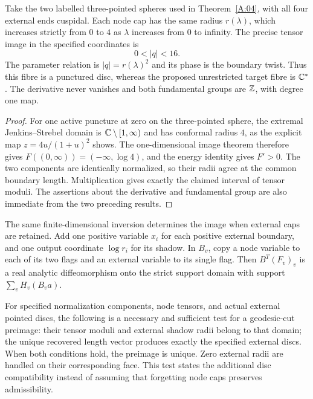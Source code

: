 \begin{example}
\label{A:04-exact-image}
Take the two labelled three-pointed spheres used in
Theorem~\ref{A:04}, with all four external ends cuspidal. Each node
cap has the same radius $r(\lambda)$, which increases strictly from
$0$ to $4$ as $\lambda$ increases from $0$ to infinity. The precise
tensor image in the specified coordinates is
\[
                    0<|q|<16.
\]
The parameter relation is $|q|=r(\lambda)^2$ and its phase is the
boundary twist. Thus this fibre is a punctured disc, whereas the
proposed unrestricted target fibre is ${\mathbb{C}}^*$. The derivative never
vanishes and both fundamental groups are ${\mathbb{Z}}$, with degree one map.
\end{example}

\begin{proof}
For one active puncture at zero on the three-pointed sphere,
the extremal Jenkins--Strebel domain is
${\mathbb{C}}\setminus[1,\infty)$ and has conformal radius $4$, as the explicit
map $z=4u/(1+u)^2$ shows. The one-dimensional image theorem therefore
gives $F((0,\infty))=(-\infty,\log4)$, and the energy identity gives
$F'>0$. The two components are identically normalized, so their
radii agree at the common boundary length. Multiplication gives
exactly the claimed interval of tensor moduli. The assertions about
the derivative and fundamental group are also immediate from the
two preceding results.
\end{proof}

\begin{proposition}
\label{A:bordered-radius-algorithm}
The same finite-dimensional inversion determines the image when
external caps are retained. Add one positive variable $x_i$ for each
positive external boundary, and one output coordinate $\log r_i$
for its shadow. In $B_v$, copy a node variable to each of its two
flags and an external variable to its single flag. Then
$B^T(F_v)_v$ is a real analytic diffeomorphism onto the strict
support domain with support $\sum_vH_v(B_va)$.

For specified normalization components, node tensors, and actual
external pointed discs, the following is a necessary and sufficient
test for a geodesic-cut preimage: their tensor moduli and external
shadow radii belong to that domain; the unique recovered length
vector produces exactly the specified external discs. When both
conditions hold, the preimage is unique. Zero external radii are
handled on their corresponding face. This test states the additional
disc compatibility instead of assuming that forgetting node caps
preserves admissibility.
\end{proposition}

